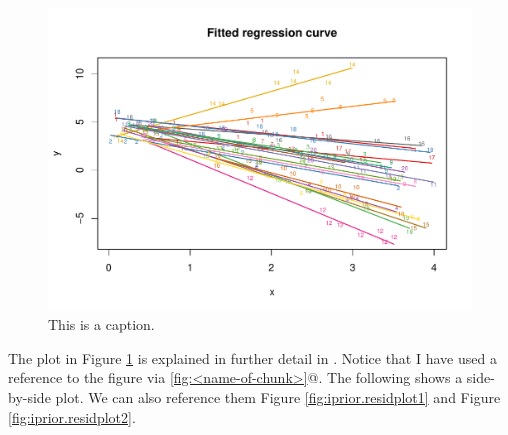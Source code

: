 \documentclass[english, 11pt]{article}\usepackage[]{graphicx}\usepackage[]{color}
\makeatletter
\def\maxwidth{ %
  \ifdim\Gin@nat@width>\linewidth
    \linewidth
  \else
    \Gin@nat@width
  \fi
}
\newenvironment{knitrout}{}{} %
\makeatother
\begin{document}
\begin{knitrout}
\color{fgcolor}\begin{figure}[h]

{\centering \includegraphics[width=\maxwidth]{figure/iprior_plot-1} 

}

\caption[This is a caption]{This is a caption.}\label{fig:iprior.plot}
\end{figure}


\end{knitrout}

The plot in Figure \ref{fig:iprior.plot} is explained in further detail in \cite{jamil2017}. Notice that I have used a reference to the figure via \verb@\ref{fig:<name-of-chunk>}@. The following shows a side-by-side plot. We can also reference them Figure \ref{fig:iprior.residplot1} and Figure \ref{fig:iprior.residplot2}.
\end{document}
